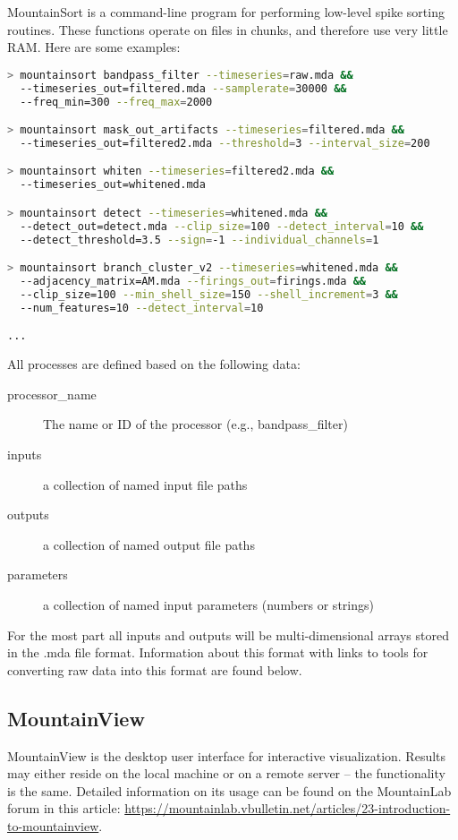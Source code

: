 \documentclass{article}
\begin{document}
MountainSort is a command-line program for performing low-level spike sorting routines. These functions operate on files in chunks, and therefore use very little RAM. Here are some examples:
\begin{lstlisting}[language=bash]
> mountainsort bandpass_filter --timeseries=raw.mda &&
  --timeseries_out=filtered.mda --samplerate=30000 &&
  --freq_min=300 --freq_max=2000

> mountainsort mask_out_artifacts --timeseries=filtered.mda &&
  --timeseries_out=filtered2.mda --threshold=3 --interval_size=200

> mountainsort whiten --timeseries=filtered2.mda &&
  --timeseries_out=whitened.mda

> mountainsort detect --timeseries=whitened.mda &&
  --detect_out=detect.mda --clip_size=100 --detect_interval=10 &&
  --detect_threshold=3.5 --sign=-1 --individual_channels=1

> mountainsort branch_cluster_v2 --timeseries=whitened.mda &&
  --adjacency_matrix=AM.mda --firings_out=firings.mda &&
  --clip_size=100 --min_shell_size=150 --shell_increment=3 &&
  --num_features=10 --detect_interval=10

...
\end{lstlisting}

All processes are defined based on the following data:
\begin{description}
\item[processor\_name] The name or ID of the processor (e.g., bandpass\_filter)
\item[inputs] a collection of named input file paths
\item[outputs] a collection of named output file paths
\item[parameters] a collection of named input parameters (numbers or strings)
\end{description}

For the most part all inputs and outputs will be multi-dimensional arrays stored in the .mda file format. Information about this format with links to tools for converting raw data into this format are found below.

\subsection{MountainView}

MountainView is the desktop user interface for interactive visualization. Results may either reside on the local machine or on a remote server -- the functionality is the same. Detailed information on its usage can be found on the MountainLab forum in this article: \url{https://mountainlab.vbulletin.net/articles/23-introduction-to-mountainview}.
\end{document}
